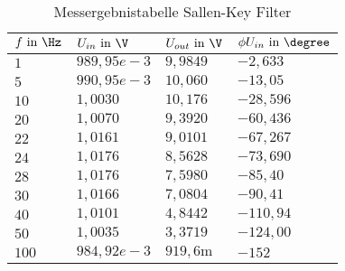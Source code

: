 \begin{table}[]
\centering
\caption{Messergebnistabelle Sallen-Key Filter}
\label{tab:sallen_key_erg_table}
\begin{tabular}{|l|l|l|l|}
\hline
\rowcolor[HTML]{C0C0C0} 
$f\text{ in }\Hz   $&$ U_{in}\text{ in }\V       $&$ U_{out}\text{ in }\V     $&$ \phi U_{in}\text{ in }\degree   $\\ \hline
$1   $&$ 989,95e-3 $&$ 9,9849   $&$ -2,633  $\\ \hline
$5   $&$ 990,95e-3 $&$ 10,060   $&$ -13,05  $\\ \hline
$10  $&$ 1,0030    $&$ 10,176   $&$ -28,596 $\\ \hline
$20  $&$ 1,0070    $&$ 9,3920   $&$ -60,436 $\\ \hline
$22  $&$ 1,0161    $&$ 9,0101   $&$ -67,267 $\\ \hline
$24  $&$ 1,0176    $&$ 8,5628   $&$ -73,690 $\\ \hline
$28  $&$ 1,0176    $&$ 7,5980   $&$ -85,40  $\\ \hline
$30  $&$ 1,0166    $&$ 7,0804   $&$ -90,41  $\\ \hline
$40  $&$ 1,0101    $&$ 4,8442   $&$ -110,94 $\\ \hline
$50  $&$ 1,0035    $&$ 3,3719   $&$ -124,00 $\\ \hline
$100 $&$ 984,92e-3 $&$ 919,6\text{m} $&$ -152    $\\ \hline
\end{tabular}
\end{table}